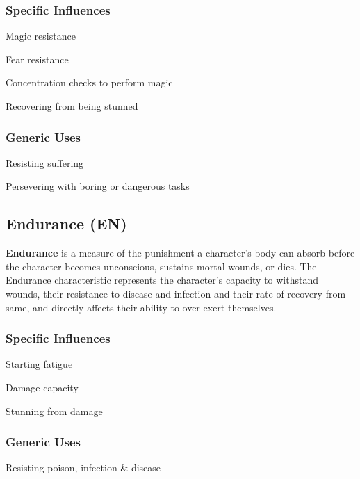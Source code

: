 \begin{multicols*}{3}
\subsubsection{Specific Influences}
\begin{Itemize}
\item Magic resistance
\item Fear resistance
\item Concentration checks to perform magic
\item Recovering from being stunned
\end{Itemize}
\subsubsection{Generic Uses}
\begin{Itemize}
\item Resisting suffering
\item Persevering with boring or dangerous tasks
\end{Itemize}

\subsection{Endurance (EN)}

\textbf{Endurance} is a measure of the punishment a character's body
can absorb before the character becomes unconscious, sustains mortal
wounds, or dies.  The Endurance characteristic represents the
character's capacity to withstand wounds, their resistance to disease
and infection and their rate of recovery from same, and directly
affects their ability to over exert themselves.
\subsubsection{Specific Influences}
\begin{Itemize}
\item Starting fatigue
\item Damage capacity
\item Stunning from damage
\end{Itemize}
\subsubsection{Generic Uses}
\begin{Itemize}
\item Resisting poison, infection \& disease
\end{Itemize}


\end{multicols*}
